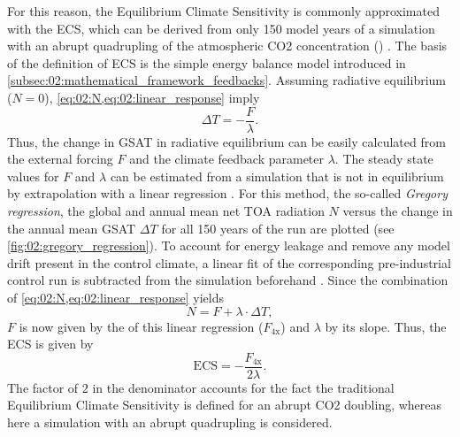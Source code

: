 For this reason, the Equilibrium Climate Sensitivity is commonly approximated
with the \acf{ECS}, which can be derived from only 150 model years of a
simulation with an abrupt quadrupling of the atmospheric \ac{CO2} concentration
() \autocite{Gregory2004}. The basis of the definition of \ac{ECS}
is the simple energy balance model introduced in
\cref{subsec:02:mathematical_framework_feedbacks}. Assuming radiative
equilibrium ($N = 0$), \cref{eq:02:N,eq:02:linear_response} imply
\begin{equation}
  \Delta T = -\frac{F}{\lambda}.
  \label{eq:02:delta_t_eq}
\end{equation}
Thus, the change in \ac{GSAT} in radiative equilibrium can be easily calculated
from the external forcing $F$ and the climate feedback parameter $\lambda$. The
steady state values for $F$ and $\lambda$ can be estimated from a 
simulation that is not in equilibrium by extrapolation with a linear regression
\autocite{Gregory2004}. For this method, the so-called \emph{Gregory
  regression}, the global and annual mean net \ac{TOA} radiation $N$ versus the
change in the annual mean \ac{GSAT} $\Delta T$ for all 150 years of the
 run are plotted (see \cref{fig:02:gregory_regression}). To account
for energy leakage and remove any model drift present in the control climate, a
linear fit of the corresponding pre-industrial control run is subtracted from
the  simulation beforehand \autocite{Andrews2012}. Since the
combination of \cref{eq:02:N,eq:02:linear_response} yields
\begin{equation}
  N = F + \lambda \cdot \Delta T,
  \label{eq:02:N_vs_delta_t}
\end{equation}
$F$ is now given by the \yintercept{} of this linear regression ($F_\text{4x}$)
and $\lambda$ by its slope. Thus, the \ac{ECS} is given by
\begin{equation}
  \text{ECS} = -\frac{F_\text{4x}}{2 \lambda}.
  \label{eq:02:ecs}
\end{equation}
The factor of $2$ in the denominator accounts for the fact the traditional
Equilibrium Climate Sensitivity is defined for an abrupt \ac{CO2} doubling,
whereas here a simulation with an abrupt quadrupling is considered.

